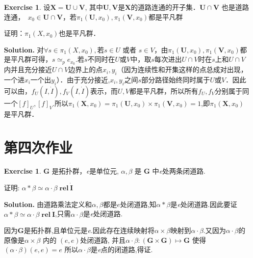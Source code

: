 \documentclass[a4paper]{book}
\newenvironment{solution}%
{\noindent\textbf{Solution.}}%
{\qedhere}
\numberwithin{equation}{chapter}
\theoremstyle{definition}
\newtheorem{exc}[exm]{Exercise}
\begin{document}
\begin{multicols}{2}
\begin{exc}
	设$ \mathbf{X} = \mathbf{U} \cup \mathbf{V} $, 其中$ \mathbf{U}, \mathbf{V} $是$ \mathbf{X} $的道路连通的开子集．$ \mathbf{U} \cap \mathbf{V} $ 也是道路连通，　$ x_0 \in  \mathbf{U} \cap \mathbf{V} $，若$ \pi_1(\mathbf{U}, x_0), \pi_1(\mathbf{V}, x_0) $都是平凡群
	
	证明：$ \pi_1(X, x_0) $也是平凡群．
\end{exc}

\begin{solution}
	对$ \forall s \in \pi_1(X, x_0), $若$ s \in U \text{ 或者 } s \in V $，由$ \pi_1(\mathbf{U}, x_0), \pi_1(\mathbf{V}, x_0) $都是平凡群可得，$ s \simeq_p e_{x_0} $.若$ s $不同时在$ U $或$ V $中，取$ s $每次进出$ U \cap V $时在$ s $上和$ U \cap V $内并且充分接近$ U \cap V $边界上的点$ x_i, y_i $（因为连续性和开集这样的点总成对出现，一个进$ x_i $一个出$ y_i $）．由于充分接近,$ x_i,y_i $之间$ s $部分路径始终同时属于$ U $或$ V $．因此可以由$ ，f_U(I,\dot{I}),f_V(I,\dot{I}) $表示，而$ U,V $都是平凡群，所以所有$ f_U,f_V $分别属于同一个$ [f]_U,[f]_V $.所以$\pi_1(\mathbf{X}, x_0) = \pi_1(\mathbf{U}, x_0) \times \pi_1(\mathbf{V}, x_0) = {1}$,即$ \pi_1(\mathbf{X}, x_0) $是平凡群．
\end{solution}

\section{第四次作业}

\begin{exc}
	$ \mathbf{G} $ 是拓扑群，\textit{e}是单位元, $ \alpha, \beta $ 是 $ \mathbf{G} $ 中\textit{e}处两条闭道路.
	
	证明: $ \alpha * \beta \simeq \alpha \cdot \beta \; \mathbf{rel} \ \dot{\mathbf{I}} $
\end{exc}

\begin{solution}
	由道路乘法定义和$ \alpha, \beta $都是$ e $处闭道路,知$ \alpha * \beta $是\textit{e}处闭道路.因此要证$ \alpha * \beta \simeq \alpha \cdot \beta \; \mathbf{rel} \ \dot{\mathbf{I}} $,只需$ \alpha \cdot \beta $是\textit{e}处闭道路.
	
	因为$ \mathbf{G} $是拓扑群,且单位元是\textit{e}.因此存在连续映射将$ \alpha \times \beta $映射到$ \alpha \cdot \beta $.又因为$ \alpha \cdot \beta $的原像是$ \alpha \times \beta $ 内的 $ (e,e) $处闭道路, 并且$ \alpha \cdot \beta : \mathbf{(G \times G) \mapsto G} $ 使得 $ (\alpha \cdot \beta)(e,e) = e $
	所以$ \alpha \cdot \beta $是\textit{e}点的闭道路,得证.
\end{solution}


\end{multicols}
\end{document}
